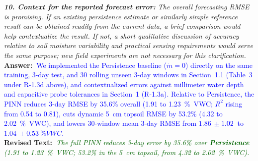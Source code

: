 \documentclass[10pt]{article}
\newcommand{\query}[2][]{\ifthenelse{\equal{#1}{}}{}{\textbf{#1:}~}\emph{#2}}
\newcommand{\ans}[1]{\textbf{Answer:~}#1}
\newcommand{\Rtext}[1]{\textbf{Revised Text:~}#1}
\begin{document}
\query[R-2.10]{\textbf{10. Context for the reported forecast error:} The overall forecasting RMSE is promising. If an existing persistence estimate or similarly simple reference result can be obtained readily from the current data, a brief comparison would help contextualize the result. If not, a short qualitative discussion of accuracy relative to soil moisture variability and practical sensing requirements would serve the same purpose; new field experiments are not necessary for this clarification.}\\
\ans{\textcolor{blue}{We implemented the Persistence baseline ($\dot{m}=0$) directly on the same training, 3-day test, and 30 rolling unseen 3-day windows in Section~1.1 (Table~3 under R-1.3d above), and contextualized errors against millimeter water depth and capacitive probe tolerances in Section~1 (R-1.3a). Relative to Persistence, the PINN reduces 3-day RMSE by 35.6\% overall (\SI{1.91}{} to \SI{1.23}{\%VWC}; $R^2$ rising from 0.54 to 0.81), cuts dynamic 5~\si{cm} topsoil RMSE by 53.2\% (\SI{4.32}{} to \SI{2.02}{\%VWC}), and lowers 30-window mean 3-day RMSE from $\SI{1.86}{}\pm\SI{1.02}{}$ to $\SI{1.04}{}\pm\SI{0.53}{\%VWC}$.}}\\
\Rtext{\emph{\textcolor{darkgreen}{The full PINN reduces 3-day error by 35.6\% over \textbf{Persistence} (1.91 to 1.23~\si{\%VWC}; 53.2\% in the 5~\si{cm} topsoil, from 4.32 to 2.02~\si{\%VWC}).}}}
\end{document}
